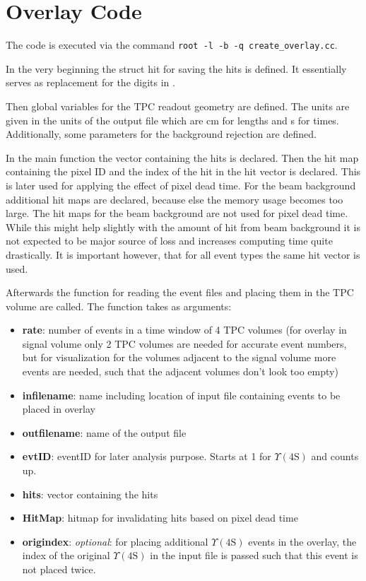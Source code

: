 \chapter{Overlay Code} 
The code is executed via the command \texttt{root -l -b -q create\_overlay.cc}.

In the very beginning the struct hit for saving the hits is defined. It essentially serves as replacement for the digits in \btwo.

Then global variables for the TPC readout geometry are defined. The units are given in the units of the output file which are \unit{\cm} for lengths and \unit{\s} for times.
Additionally, some parameters for the background rejection are defined.

In the main function the vector containing the hits is declared. Then the hit map containing the pixel ID and the index of the hit in the hit vector is declared. This is later used for applying the effect of pixel dead time. For the beam background additional hit maps are declared, because else the memory usage becomes too large. The hit maps for the beam background are not used for pixel dead time. While this might help slightly with the amount of hit from beam background it is not expected to be major source of loss and increases computing time quite drastically. It is important however, that for all event types the same hit vector is used.

Afterwards the function for reading the event files and placing them in the TPC volume are called. The function takes as arguments:
\begin{itemize}
	\item \textbf{rate}: number of events in a time window of 4 TPC volumes (for overlay in signal volume only 2 TPC volumes are needed for accurate event numbers, but for visualization for the volumes adjacent to the signal volume more events are needed, such that the adjacent volumes don't look too empty)
	\item \textbf{infilename}: name including location of input file containing events to be placed in overlay
	\item \textbf{outfilename}: name of the output file
	\item \textbf{evtID}: eventID for later analysis purpose. Starts at 1 for $\Upsilon (4\text{S})$ and counts up.
	\item \textbf{hits}: vector containing the hits
	\item \textbf{HitMap}: hitmap for invalidating hits based on pixel dead time
	\item \textbf{origindex}: \textit{optional}: for placing additional $\Upsilon (4\text{S})$ events in the overlay, the index of the original $\Upsilon (4\text{S})$ in the input file is passed such that this event is not placed twice. 
\end{itemize}
